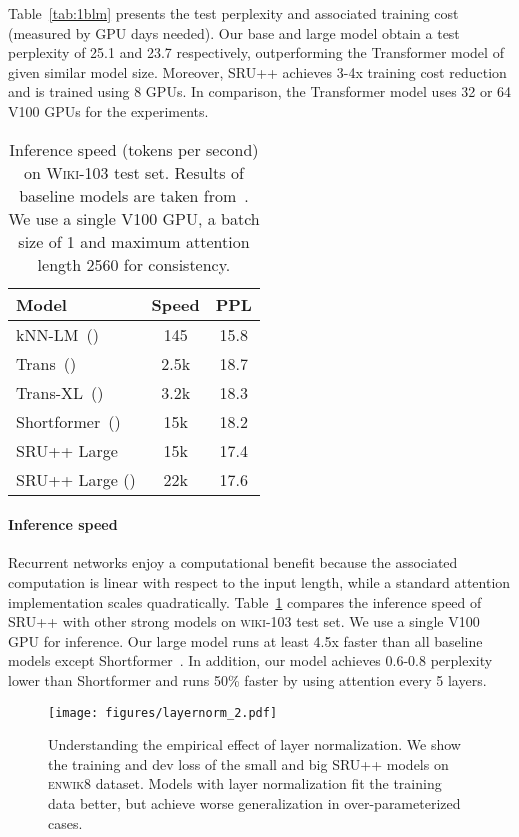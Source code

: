 \documentclass[11pt,a4paper]{article}
\begin{document}
Table~\ref{tab:1blm} presents the test perplexity and associated training cost (measured by GPU days needed).
Our base and large model obtain a test perplexity of 25.1 and 23.7 respectively, outperforming the Transformer model of~\citet{baevski2018adaptive} given similar model size.
Moreover, SRU++ achieves 3-4x training cost reduction and is trained using 8 GPUs.
In comparison, the Transformer model uses 32 or 64 V100 GPUs for the experiments.

\begin{table}[!t]
    \centering
    \begin{tabular}{lcc}
    \toprule
    \bf Model & \bf Speed & \bf PPL\\
    \hline
    kNN-LM~(\citeauthor{Khandelwal2020Generalization}) & 145 & 15.8\\
    Trans~(\citeauthor{baevski2018adaptive}) & 2.5k & 18.7\\
    Trans-XL~(\citeauthor{dai-etal-2019-transformer}) & 3.2k & 18.3 \\
    Shortformer~(\citeauthor{press2020shortformer}) & 15k & 18.2\\
    \hline
    SRU++ Large & 15k & 17.4\\
    SRU++ Large () & 22k & 17.6\\
    \bottomrule
    \end{tabular}
    \caption{Inference speed (tokens per second) on \textsc{Wiki-103} test set. Results of baseline models are taken from~\citet{press2020shortformer}. We use a single V100 GPU, a batch size of 1 and maximum attention length 2560 for consistency.}
    \label{tab:inference_speed}
\end{table}

\paragraph{Inference speed}
Recurrent networks enjoy a computational benefit because the associated computation is linear with respect to the input length, while a standard attention implementation scales quadratically. 
Table~\ref{tab:inference_speed} compares the inference speed of SRU++ with other strong models on \textsc{wiki-103} test set.
We use a single V100 GPU for inference.
Our large model runs at least 4.5x faster than all baseline models except Shortformer~\cite{press2020shortformer}.
In addition, our model achieves 0.6-0.8 perplexity lower than Shortformer and runs 50\% faster by using attention every 5 layers.

\begin{figure}
   \centering
    \texttt{[image: figures/layernorm\_2.pdf]}
    \caption{Understanding the empirical effect of layer normalization. We show the training and dev loss of the small and big SRU++ models on \textsc{enwik8} dataset. Models with layer normalization fit the training data better, but achieve worse generalization in over-parameterized cases.}
    \label{fig:analyze_layernorm}
\end{figure}
\end{document}

